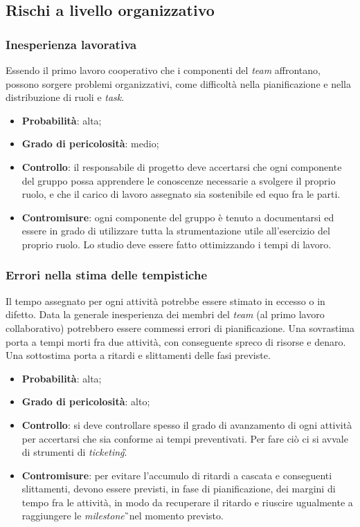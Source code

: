 \subsection{Rischi a livello organizzativo}

\subsubsection{Inesperienza lavorativa}
\label{sec:IneLav}
Essendo il primo lavoro cooperativo che i componenti del \textit{team} affrontano, possono sorgere problemi organizzativi, come difficoltà nella pianificazione e nella distribuzione di ruoli e \textit{task}. 
\begin{itemize}
\item \textbf{Probabilità}: alta;
\item \textbf{Grado di pericolosità}: medio;
\item \textbf{Controllo}: il responsabile di progetto deve accertarsi che ogni componente del gruppo possa apprendere le conoscenze necessarie a svolgere il proprio ruolo, e che il carico di lavoro assegnato sia sostenibile ed equo fra le parti.
\item \textbf{Contromisure}: ogni componente del gruppo è tenuto a documentarsi ed essere in grado di utilizzare tutta la strumentazione utile all'esercizio del proprio ruolo. Lo studio deve essere fatto ottimizzando i tempi di lavoro.
\end{itemize} 

\subsubsection{Errori nella stima delle tempistiche}
\label{sec:ErrTemp}
Il tempo assegnato per ogni attività potrebbe essere stimato in eccesso o in difetto. Data la generale inesperienza dei membri del \textit{team} (al primo lavoro collaborativo) potrebbero essere commessi errori di pianificazione. Una sovrastima porta a tempi morti fra due attività, con conseguente spreco di risorse e denaro. Una sottostima porta a ritardi e slittamenti delle fasi previste.
\begin{itemize}
\item \textbf{Probabilità}: alta;
\item \textbf{Grado di pericolosità}: alto;
\item \textbf{Controllo}: si deve controllare spesso il grado di avanzamento di ogni attività per accertarsi che sia conforme ai tempi preventivati. Per fare ciò ci si avvale di strumenti di \textit{ticketing}\G.
\item \textbf{Contromisure}: per evitare l'accumulo di ritardi a cascata e conseguenti slittamenti, devono essere previsti, in fase di pianificazione, dei margini di tempo fra le attività, in modo da recuperare il ritardo e riuscire ugualmente a raggiungere le \textit{milestone}\G\ nel momento previsto. 
\end{itemize}

